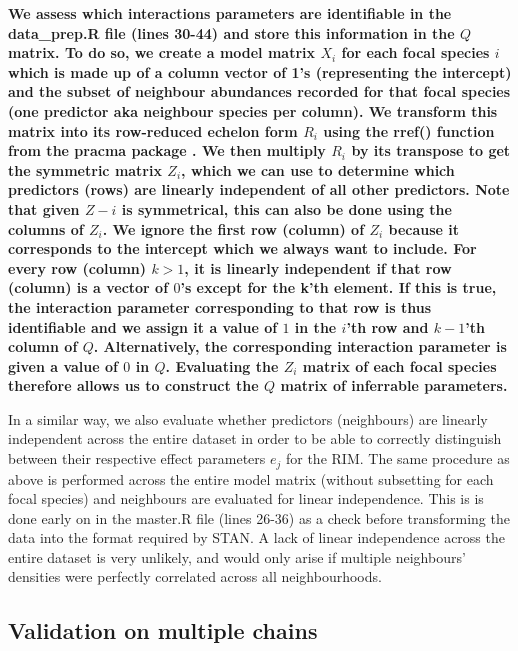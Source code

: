 \begin{refsection}
    \textbf{We assess which interactions parameters are identifiable in the data\_prep.R file (lines 30-44) and store this information in the $Q$ matrix. To do so, we create a model matrix $X_i$ for each focal species $i$ which is made up of a column vector of 1's (representing the intercept) and the subset of neighbour abundances recorded for that focal species (one predictor aka neighbour species per column). We transform this matrix into its row-reduced echelon form $R_i$ using the rref() function from the pracma package \parencite{Borchers2022}. We then multiply $R_i$ by its transpose to get the symmetric matrix $Z_i$, which we can use to determine which predictors (rows) are linearly independent of all other predictors. Note that given $Z-i$ is symmetrical, this can also be done using the columns of $Z_i$. We ignore the first row (column) of $Z_i$ because it corresponds to the intercept which we always want to include. For every row (column) $k > 1$, it is linearly independent if that row (column) is a vector of $0$'s except for the k'th element. If this is true, the interaction parameter corresponding to that row is thus identifiable and we assign it a value of $1$ in the $i$'th row and $k-1$'th column of $Q$. Alternatively, the corresponding interaction parameter is given a value of $0$ in $Q$. Evaluating the $Z_i$ matrix of each focal species therefore allows us to construct the $Q$ matrix of inferrable parameters.}

    In a similar way, we also evaluate whether predictors (neighbours) are linearly independent across the entire dataset in order to be able to correctly distinguish between their respective effect parameters $e_j$ for the RIM. The same procedure as above is performed across the entire model matrix (without subsetting for each focal species) and neighbours are evaluated for linear independence. This is is done early on in the master.R file (lines 26-36) as a check before transforming the data into the format required by STAN. A lack of linear independence across the entire dataset is very unlikely, and would only arise if multiple neighbours' densities were perfectly correlated across all neighbourhoods.


    \subsection{Validation on multiple chains}
    \label{SI:multichains}



\end{refsection}
